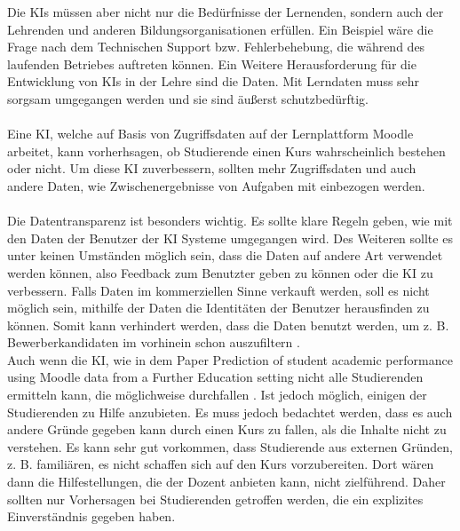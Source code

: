 Die KIs müssen aber nicht nur die Bedürfnisse der Lernenden, sondern auch der Lehrenden und anderen Bildungsorganisationen erfüllen.
Ein Beispiel wäre die Frage nach dem Technischen Support bzw. Fehlerbehebung, die während des laufenden Betriebes auftreten können.
Ein Weitere Herausforderung für die Entwicklung von KIs in der Lehre sind die Daten. Mit Lerndaten muss sehr sorgsam umgegangen werden und sie sind äußerst schutzbedürftig. \cite[S. 10ff]{Pinkwart.2016}
\\
\\ \noindent
Eine KI, welche auf Basis von Zugriffsdaten auf der Lernplattform Moodle arbeitet, kann vorherhsagen, ob Studierende einen Kurs wahrscheinlich bestehen oder nicht.
Um diese KI zuverbessern, sollten mehr Zugriffsdaten und auch andere Daten, wie Zwischenergebnisse von Aufgaben mit einbezogen werden. \cite[S. 15]{Quinn.2020}
\\
\\ \noindent
Die Datentransparenz ist besonders wichtig.
Es sollte klare Regeln geben, wie mit den Daten der Benutzer der KI Systeme umgegangen wird.
Des Weiteren sollte es unter keinen Umständen möglich sein, dass die Daten auf andere Art verwendet werden können, also Feedback zum Benutzter geben zu können oder die KI zu verbessern.
Falls Daten im kommerziellen Sinne verkauft werden, soll es nicht möglich sein, mithilfe der Daten die Identitäten der Benutzer herausfinden zu können.
Somit kann verhindert werden, dass die Daten benutzt werden, um z. B. Bewerberkandidaten im vorhinein schon auszufiltern \cite[S. 8f]{Pinkwart.2016}. 
\\ \noindent
Auch wenn die KI, wie in dem Paper \glqq Prediction of student academic performance using Moodle data from a Further Education setting\grqq{} nicht alle Studierenden ermitteln kann, die möglichweise durchfallen \cite[S. 16]{Quinn.2020}.
Ist jedoch möglich, einigen der Studierenden zu Hilfe anzubieten. Es muss jedoch bedachtet werden, dass es auch andere Gründe gegeben kann durch einen Kurs zu fallen, als die Inhalte nicht zu verstehen.
Es kann sehr gut vorkommen, dass Studierende aus externen Gründen, z. B. familiären, es nicht schaffen sich auf den Kurs vorzubereiten.
Dort wären dann die Hilfestellungen, die der Dozent anbieten kann, nicht zielführend.
Daher sollten nur Vorhersagen bei Studierenden getroffen werden, die ein explizites Einverständnis gegeben haben.
